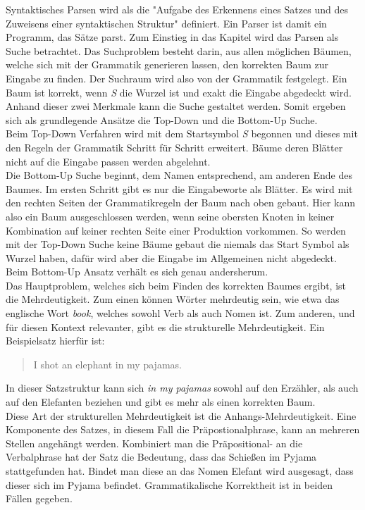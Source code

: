 Syntaktisches Parsen wird als die "Aufgabe des Erkennens eines Satzes und des Zuweisens einer syntaktischen Struktur" definiert. %
Ein Parser ist damit ein Programm, das Sätze parst.
Zum Einstieg in das Kapitel wird das Parsen als Suche betrachtet. Das Suchproblem besteht darin, aus allen möglichen Bäumen, welche sich mit der Grammatik generieren lassen, den korrekten Baum zur Eingabe zu finden. Der Suchraum wird also von der Grammatik festgelegt. Ein Baum ist korrekt, wenn \textit{S} die Wurzel ist und exakt die Eingabe abgedeckt wird. Anhand dieser zwei Merkmale kann die Suche gestaltet werden. Somit ergeben sich als grundlegende Ansätze die Top-Down und die Bottom-Up Suche. \\
Beim Top-Down Verfahren wird mit dem Startsymbol \textit{S} begonnen und dieses mit den Regeln der Grammatik Schritt für Schritt erweitert. Bäume deren Blätter nicht auf die Eingabe passen werden abgelehnt. \\
Die Bottom-Up Suche beginnt, dem Namen entsprechend, am anderen Ende des Baumes. Im ersten Schritt gibt es nur die Eingabeworte als Blätter. Es wird mit den rechten Seiten der Grammatikregeln der Baum nach oben gebaut. Hier kann also ein Baum ausgeschlossen werden, wenn seine obersten Knoten in keiner Kombination auf keiner rechten Seite einer Produktion vorkommen. %
So werden mit der Top-Down Suche keine Bäume gebaut die niemals das Start Symbol als Wurzel haben, dafür wird aber die Eingabe im Allgemeinen nicht abgedeckt. Beim Bottom-Up Ansatz verhält es sich genau andersherum. \\
Das Hauptproblem, welches sich beim Finden des korrekten Baumes ergibt, ist die Mehrdeutigkeit. Zum einen können Wörter mehrdeutig sein, wie etwa das englische Wort \textit{book}, welches sowohl Verb als auch Nomen ist. Zum anderen, und für diesen Kontext relevanter, gibt es die strukturelle Mehrdeutigkeit. Ein Beispielsatz hierfür ist: 
\begin{quote}
I shot an elephant in my pajamas.
\end{quote}
In dieser Satzstruktur kann sich \textit{in my pajamas} sowohl auf den Erzähler, als auch auf den Elefanten beziehen und gibt es mehr als einen korrekten Baum. \\ %
Diese Art der strukturellen Mehrdeutigkeit ist die Anhangs-Mehrdeutigkeit. Eine Komponente des Satzes, in diesem Fall die Präpostionalphrase, kann an mehreren Stellen angehängt werden. Kombiniert man die Präpositional- an die Verbalphrase hat der Satz die Bedeutung, dass das Schießen im Pyjama stattgefunden hat. Bindet man diese an das Nomen Elefant wird ausgesagt, dass dieser sich im Pyjama befindet. Grammatikalische Korrektheit ist in beiden Fällen gegeben. \\

